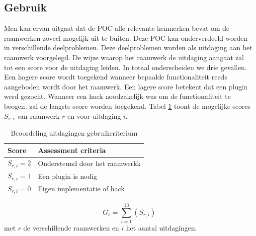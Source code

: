 \subsection{Gebruik}
\label{sec:vergelijking-gebruik}
Men kan ervan uitgaat dat de POC alle relevante kenmerken bevat om de raamwerken zoveel mogelijk uit te buiten. 
Deze POC kan onderverdeeld worden in verschillende deelproblemen.
Deze deelproblemen worden als uitdaging aan het raamwerk voorgelegd.
De wijze waarop het raamwerk de uitdaging aangaat zal tot een score voor de uitdaging leiden.
In totaal onderscheiden we drie gevallen.
Een hogere score wordt toegekend wanneer bepaalde functionaliteit reeds aangeboden wordt door het raamwerk. 
Een lagere score betekent dat een plugin werd gezocht. 
Wanneer een hack noodzakelijk was om de functionaliteit te beogen, zal de laagste score worden toegekend.
Tabel \ref{tabel:scores-uitdagingen} toont de mogelijke scores $S_{r,i}$ van raamwerk $r$ en voor uitdaging $i$.
\begin{table}[h]	
  \centering
  \begin{tabular}{ll}
    \toprule
    \textbf{Score} & \textbf{Assessment criteria}\\
    \midrule
    $S_{r,i} = 2$ & Ondersteund door het raamwerkk\\
    $S_{r,i} = 1$ & Een plugin is nodig\\
    $S_{r,i} = 0$ & Eigen implementatie of hack\\
    \bottomrule
  \end{tabular}
  \caption{Beoordeling uitdagingen gebruikcriterium}
  \label{tabel:scores-uitdagingen}
\end{table}
\begin{equation}
  G_r = \sum_{i=1}^{13}{\left(S_{r,i}\right)}
  \label{eq:gebruik}
\end{equation}
met $r$ de verschillende raamwerken en $i$ het aantal uitdagingen.


